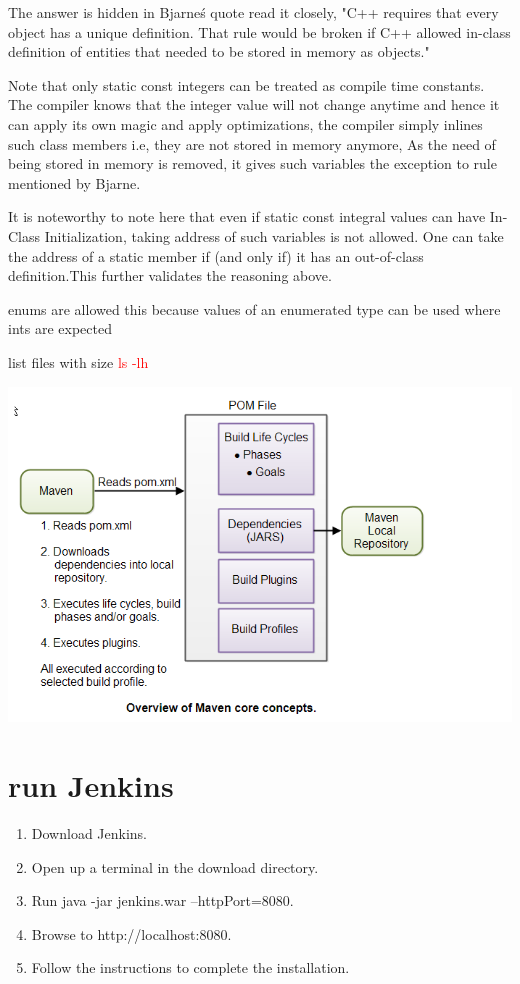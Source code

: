 \documentclass[a4paper]{tufte-handout}
\begin{document}
The answer is hidden in Bjarne\'s quote read it closely,
"C++ requires that every object has a unique definition. That rule would be broken if C++ allowed in-class definition of entities that needed to be stored in memory as objects."

Note that only static const integers can be treated as compile time constants. The compiler knows that the integer value will not change anytime and hence it can apply its own magic and apply optimizations, the compiler simply inlines such class members i.e, they are not stored in memory anymore, As the need of being stored in memory is removed, it gives such variables the exception to rule mentioned by Bjarne.

It is noteworthy to note here that even if static const integral values can have In-Class Initialization, taking address of such variables is not allowed. One can take the address of a static member if (and only if) it has an out-of-class definition.This further validates the reasoning above.

enums are allowed this because values of an enumerated type can be used where ints are expected

list files with size \textcolor{red}{ls -lh}

\includegraphics[width=\textwidth]{pics/maven}

\chapter{run Jenkins}
\begin{enumerate}
\item{Download Jenkins.}
\item Open up a terminal in the download directory.
\item Run java -jar jenkins.war --httpPort=8080.
\item Browse to http://localhost:8080.
\item Follow the instructions to complete the installation.
\end{enumerate}



\end{document}
